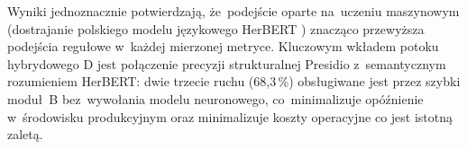 \noindent Wyniki jednoznacznie potwierdzają, że~podejście oparte
na~uczeniu maszynowym (dostrajanie polskiego modelu językowego HerBERT
\cite{bib:herbert}) znacząco przewyższa podejścia regułowe w~każdej
mierzonej metryce. Kluczowym wkładem potoku hybrydowego D jest połączenie
precyzji strukturalnej Presidio \cite{bib:presidio} z~semantycznym rozumieniem
HerBERT: dwie trzecie ruchu (68{,}3\,\%) obsługiwane jest przez szybki moduł~B
bez~wywołania modelu neuronowego, co~minimalizuje opóźnienie w~środowisku
produkcyjnym oraz minimalizuje koszty operacyjne co jest istotną zaletą.
